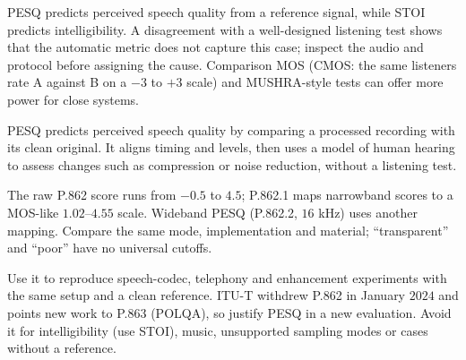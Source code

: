 \metricsecondary

PESQ predicts perceived speech quality from a reference signal, while STOI predicts intelligibility. A disagreement with a well-designed
listening test shows that the automatic metric does not capture this case; inspect the audio and protocol before assigning the cause.
Comparison MOS (CMOS: the same listeners rate A against B on a $-3$ to $+3$ scale) and MUSHRA-style tests can offer more power for close
systems.

\metricend
\clearpage
\thispagestyle{genaistyle}
\label{sec:pesq}


PESQ predicts perceived speech quality by comparing a processed recording with its clean original. It aligns timing and levels, then uses a model of human hearing to assess changes such as compression or noise reduction, without a listening test.

\begin{metricformula}
\end{metricformula}

The raw P.862 score runs from $-0.5$ to $4.5$; P.862.1 maps narrowband scores to a MOS-like $1.02$--$4.55$ scale. Wideband PESQ
(P.862.2, $16$ kHz) uses another mapping. Compare the same mode, implementation and material; ``transparent'' and ``poor'' have no
universal cutoffs.


Use it to reproduce speech-codec, telephony and enhancement experiments with the same setup and a clean reference. ITU-T withdrew P.862
in January $2024$ and points new work to P.863 (POLQA), so justify PESQ in a new evaluation. Avoid it for intelligibility (use STOI),
music, unsupported sampling modes or cases without a reference.


